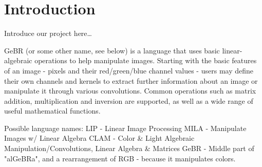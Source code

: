 \chapter{Introduction}

Introduce our project here\ldots

GeBR (or some other name, see below) is a language that uses basic linear-algebraic operations to help manipulate images. Starting with the basic features of an image - pixels and their red/green/blue channel values - users may define their own channels and kernels to extract further information about an image or manipulate it through various convolutions. Common operations such as matrix addition, multiplication and inversion are supported, as well as a wide range of useful mathematical functions. 

Possible language names:
LIP - Linear Image Processing
MILA - Manipulate Images w/ Linear Algebra
CLAM - Color & Light Algebraic Manipulation/Convolutions, Linear Algebra & Matrices
GeBR - Middle part of "alGeBRa", and a rearrangement of RGB - because it manipulates colors.
